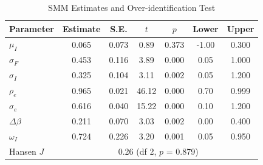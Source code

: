 \begin{table}[htbp]
\centering
\caption{SMM Estimates and Over-identification Test}
\label{tab:smm_se}
\small
\begin{tabular}{lcccccc}
\toprule
Parameter & Estimate & S.E. & $t$ & $p$ & Lower & Upper \\
\midrule
$\mu_I$ & 0.065 & 0.073 & 0.89 & 0.373 & -1.00 & 0.300 \\
$\sigma_F$ & 0.453 & 0.116 & 3.89 & 0.000 & 0.05 & 1.000 \\
$\sigma_I$ & 0.325 & 0.104 & 3.11 & 0.002 & 0.05 & 1.200 \\
$\rho_e$ & 0.965 & 0.021 & 46.12 & 0.000 & 0.70 & 0.999 \\
$\sigma_e$ & 0.616 & 0.040 & 15.22 & 0.000 & 0.10 & 1.200 \\
$\Delta\beta$ & 0.211 & 0.070 & 3.03 & 0.002 & 0.00 & 0.400 \\
$\omega_I$ & 0.724 & 0.226 & 3.20 & 0.001 & 0.05 & 0.950 \\
\midrule
Hansen $J$ & \multicolumn{6}{c}{0.26  (df 2, $p$ = 0.879)} \\
\bottomrule
\end{tabular}
\end{table}
